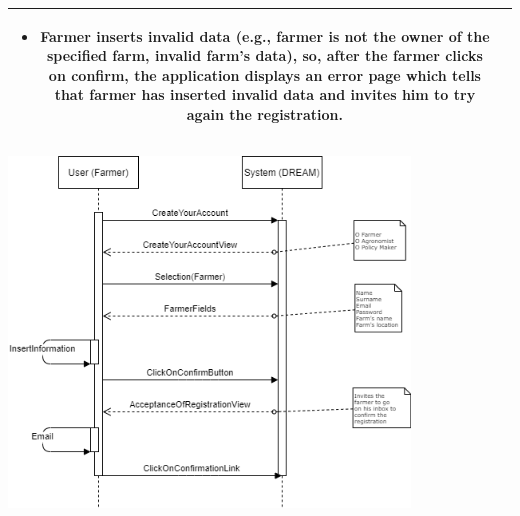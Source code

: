 \documentclass{article}
\begin{document}
\begin{center}
\begin{longtable}{|c| p{10cm}|}
\begin{itemize}
                        \item Farmer inserts invalid data (e.g., farmer is not the owner of the specified farm, invalid farm’s data), so, after the farmer clicks on confirm, the application displays an error page which tells that farmer has inserted invalid data and invites him to try again the registration.
                    \end{itemize}\\
        \hline
    \end{longtable}
    
    \includegraphics[width=0.8\textwidth]{images/sequenceDiagrams/1. SignUpFarmer.png} 
    \par
    \caption{\label{fig:frog}Sign Up Farmer}
        
    \newpage
    
    
    
    
    
    

\end{center}
\end{document}
